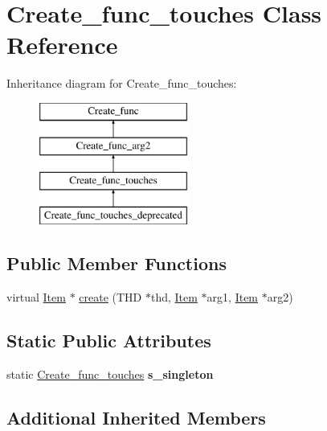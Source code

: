 \hypertarget{classCreate__func__touches}{}\section{Create\+\_\+func\+\_\+touches Class Reference}
\label{classCreate__func__touches}
Inheritance diagram for Create\+\_\+func\+\_\+touches\+:\begin{figure}[H]
\begin{center}
\leavevmode
\includegraphics[height=4.000000cm]{classCreate__func__touches}
\end{center}
\end{figure}
\subsection*{Public Member Functions}
\begin{DoxyCompactItemize}
\item 
virtual \mbox{\hyperlink{classItem}{Item}} $\ast$ \mbox{\hyperlink{classCreate__func__touches_ab9f411ea9ed7225844954f0463b82d3f}{create}} (T\+HD $\ast$thd, \mbox{\hyperlink{classItem}{Item}} $\ast$arg1, \mbox{\hyperlink{classItem}{Item}} $\ast$arg2)
\end{DoxyCompactItemize}
\subsection*{Static Public Attributes}
\begin{DoxyCompactItemize}
\item 
\mbox{\label{classCreate__func__touches_ad9a03ac0ed1c61cd079a282c068217af}} 
static \mbox{\hyperlink{classCreate__func__touches}{Create\+\_\+func\+\_\+touches}} {\bfseries s\+\_\+singleton}
\end{DoxyCompactItemize}
\subsection*{Additional Inherited Members}


